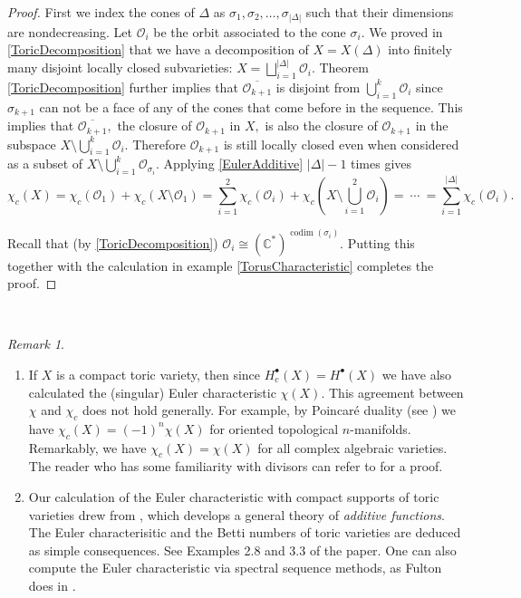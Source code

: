 \documentclass[BSc]{usydthesis}
\numberwithin{equation}{chapter}
\theoremstyle{remark}
\newtheorem{Remark}[equation]{Remark}
\newcommand{\C}{\mathbb{C}}
\begin{document}
\begin{proof}
 First we index the cones of $\Delta$ as $\sigma_1, \sigma_2, \ldots, \sigma_{|\Delta|}$ such that their dimensions are nondecreasing. Let $\mathcal{O}_i$ be the orbit associated to the cone $\sigma_i.$ We proved in \ref{ToricDecomposition} that we have a decomposition of $X=X(\Delta)$ into finitely many disjoint locally closed subvarieties: $\displaystyle X= \bigsqcup_{i=1}^{|\Delta|} \mathcal{O}_{i}.$ Theorem \ref{ToricDecomposition} further implies that $\overline{\mathcal{O}_{k+1}}$ is disjoint from $\bigcup_{i=1}^{k} \mathcal{O}_{i}$ since $\sigma_{k+1}$ can not be a face of any of the cones that come before in the sequence. This implies that $\overline{\mathcal{O}_{k+1}},$ the closure of $\mathcal{O}_{k+1}$ in $X,$ is also the closure of $\mathcal{O}_{k+1}$ in the subspace $X\setminus \bigcup_{i=1}^k \mathcal{O}_{i}.$ Therefore $\mathcal{O}_{k+1}$ is still locally closed even when considered as a subset of $X\setminus \bigcup_{i=1}^k \mathcal{O}_{\sigma_i}.$ Applying \ref{EulerAdditive} $|\Delta|-1$ times gives $$ \chi_c(X) = \chi_c( \mathcal{O}_1) + \chi_c (X\setminus \mathcal{O}_1) = \sum_{i=1}^2 \chi_c( \mathcal{O}_i) + \chi_c (X\setminus \bigcup_{i=1}^2 \mathcal{O}_i ) = \ \cdots \ = \sum_{i=1}^{|\Delta|} \chi_c(\mathcal{O}_i).$$
 
Recall that (by \ref{ToricDecomposition}) $\mathcal{O}_i \cong (\C^*)^{\operatorname{codim}(\sigma_i)}.$ Putting this together with the calculation in example \ref{TorusCharacteristic} completes the proof.   
\end{proof}
~
\begin{Remark}
~
\begin{enumerate}
 \item  If $X$ is a compact toric variety, then since $H^{\bullet}_c(X) = H^{\bullet}(X)$ we have also calculated the (singular) Euler characteristic $\chi(X).$ This agreement between $\chi$ and $\chi_c$ does not hold generally. For example, by Poincar\'{e} duality (see \cite[Page.~ 245, Theorem 3.35]{Hatcher}) we have $\chi_c(X)=(-1)^n \chi(X)$ for oriented topological $n$-manifolds. Remarkably, we have $\chi_c(X)=\chi(X)$ for all complex algebraic varieties. The reader who has some familiarity with divisors can refer to \cite[Page.~ 141-142]{Fulton:Toric} for a proof.
 \item Our calculation of the Euler characteristic with compact supports of toric varieties drew from \cite{DimcaLehrer}, which develops a general theory of {\em additive functions}. The Euler characterisitic and the Betti numbers of toric varieties are deduced as simple consequences. See Examples 2.8 and 3.3 of the paper. One can also compute the Euler characteristic via spectral sequence methods, as Fulton does in \cite[Page.~ 58-59]{Fulton:Toric}.
\end{enumerate}

\end{Remark}
\end{document}
